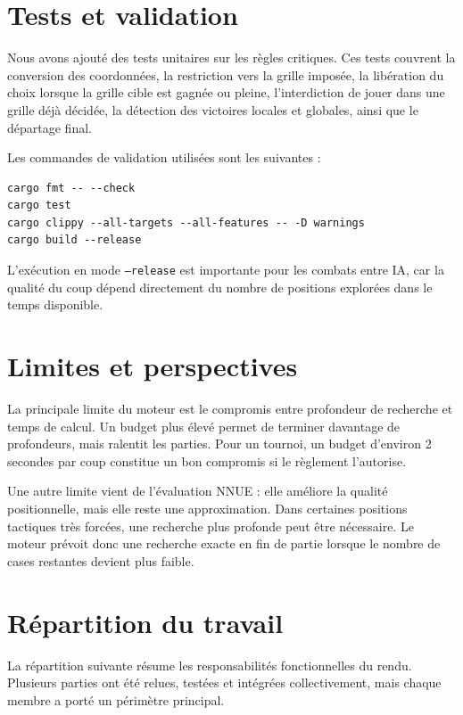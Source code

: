 \documentclass{pssbmac}
\begin{document}
\section{Tests et validation}

Nous avons ajouté des tests unitaires sur les règles critiques. Ces tests couvrent la conversion des coordonnées, la restriction vers la grille imposée, la libération du choix lorsque la grille cible est gagnée ou pleine, l'interdiction de jouer dans une grille déjà décidée, la détection des victoires locales et globales, ainsi que le départage final.

Les commandes de validation utilisées sont les suivantes :

\begin{lstlisting}[style=codeexcerpt,caption={Commandes de validation du projet}]
cargo fmt -- --check
cargo test
cargo clippy --all-targets --all-features -- -D warnings
cargo build --release
\end{lstlisting}

L'exécution en mode \texttt{--release} est importante pour les combats entre IA, car la qualité du coup dépend directement du nombre de positions explorées dans le temps disponible.

\section{Limites et perspectives}

La principale limite du moteur est le compromis entre profondeur de recherche et temps de calcul. Un budget plus élevé permet de terminer davantage de profondeurs, mais ralentit les parties. Pour un tournoi, un budget d'environ 2 secondes par coup constitue un bon compromis si le règlement l'autorise.

Une autre limite vient de l'évaluation NNUE : elle améliore la qualité positionnelle, mais elle reste une approximation. Dans certaines positions tactiques très forcées, une recherche plus profonde peut être nécessaire. Le moteur prévoit donc une recherche exacte en fin de partie lorsque le nombre de cases restantes devient plus faible.

\section{Répartition du travail}

La répartition suivante résume les responsabilités fonctionnelles du rendu. Plusieurs parties ont été relues, testées et intégrées collectivement, mais chaque membre a porté un périmètre principal.
\end{document}
